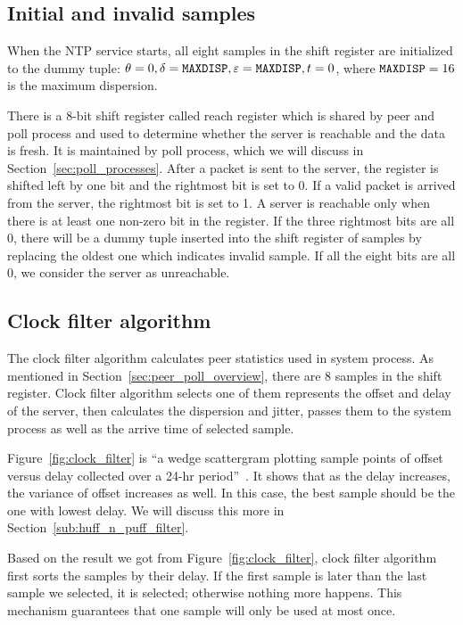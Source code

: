 \subsection{Initial and invalid samples}%
\label{sub:initial_and_invalid_samples}
When the NTP service starts, all eight samples in the shift register are
initialized to the dummy tuple: $\theta = 0, \delta = \verb|MAXDISP|,
\varepsilon = \verb|MAXDISP|, t = 0$, where $\verb|MAXDISP| = 16$ is the
maximum dispersion.~\cite{rfc5905} 

There is a 8-bit shift register called reach register which is shared by peer
and poll process and used to determine whether the server is reachable and the
data is fresh. It is maintained by poll process, which we will discuss in
Section~\ref{sec:poll_processes}. After a packet is sent to the server, the
register is shifted left by one bit and the rightmost bit is set to 0. If a
valid packet is arrived from the server, the rightmost bit is set to 1. A
server is reachable only when there is at least one non-zero bit in the
register. If the three rightmost bits are all 0, there will be a dummy tuple
inserted into the shift register of samples by replacing the oldest one which
indicates invalid sample. If all the eight bits are all 0, we consider the
server as unreachable.

\subsection{Clock filter algorithm}%
\label{sub:clock_filter_algorithm}
The clock filter algorithm calculates peer statistics used in system process.
As mentioned in Section~\ref{sec:peer_poll_overview}, there are 8 samples in
the shift register. Clock filter algorithm selects one of them represents the
offset and delay of the server, then calculates the dispersion and jitter,
passes them to the system process as well as the arrive time of selected
sample.

Figure~\ref{fig:clock_filter} is ``a wedge scattergram plotting sample points
of offset versus delay collected over a 24-hr period''~\cite{clock_filter}. It
shows that as the delay increases, the variance of offset increases as
well. In this case, the best sample should be the one with lowest delay. We
will discuss this more in Section~\ref{sub:huff_n_puff_filter}.



Based on the result we got from Figure~\ref{fig:clock_filter}, clock filter
algorithm first sorts the samples by their delay. If the first sample is later
than the last sample we selected, it is selected; otherwise nothing more
happens. This mechanism guarantees that one sample will only be used at most
once.

